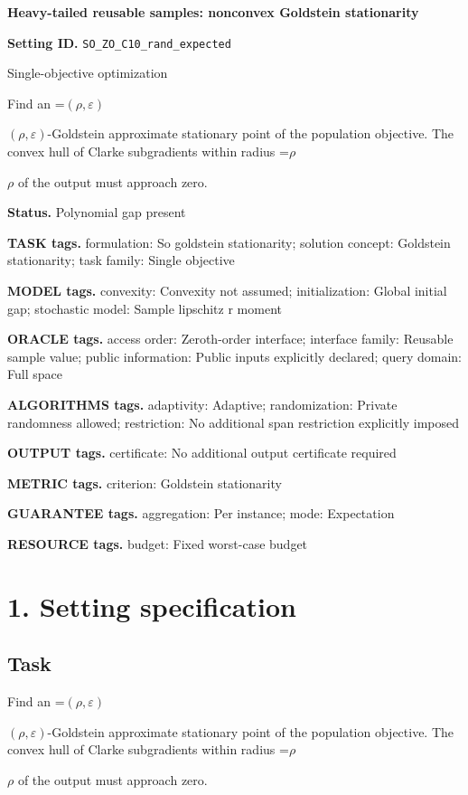 \documentclass[10pt,a4paper]{article}
\newcommand{\AtlasMath}[1]{\par\begingroup\centering\setbox0=\hbox{$\displaystyle #1$}\ifdim\wd0>1.4\linewidth\typeout{ATLAS WIDE FORMULA: \the\wd0}\fi\ifdim\wd0>\linewidth\resizebox{\linewidth}{!}{\box0}\else\box0\fi\par\endgroup}
\newcommand{\AtlasInlineMath}[1]{\begingroup\setbox0=\hbox{$#1$}\ifdim\wd0>.4\linewidth\endgroup\AtlasMath{#1}\else\endgroup$#1$\fi}
\begin{document}
\raggedright

{\LARGE\bfseries\sffamily\color{AtlasNavy} Heavy-tailed reusable samples: nonconvex Goldstein stationarity\par}\vspace{5pt}
\textbf{Setting ID.} \texttt{SO\_\allowbreak{}ZO\_\allowbreak{}C10\_\allowbreak{}rand\_\allowbreak{}expected}

Single-objective optimization

Find an \AtlasInlineMath{(\rho,\varepsilon)}-Goldstein approximate stationary point of the population objective. The convex hull of Clarke subgradients within radius \AtlasInlineMath{\rho} of the output must approach zero.

\textbf{Status.} Polynomial gap present

\textbf{TASK tags.} formulation: So goldstein stationarity; solution concept: Goldstein stationarity; task family: Single objective

\textbf{MODEL tags.} convexity: Convexity not assumed; initialization: Global initial gap; stochastic model: Sample lipschitz r moment

\textbf{ORACLE tags.} access order: Zeroth-order interface; interface family: Reusable sample value; public information: Public inputs explicitly declared; query domain: Full space

\textbf{ALGORITHMS tags.} adaptivity: Adaptive; randomization: Private randomness allowed; restriction: No additional span restriction explicitly imposed

\textbf{OUTPUT tags.} certificate: No additional output certificate required

\textbf{METRIC tags.} criterion: Goldstein stationarity

\textbf{GUARANTEE tags.} aggregation: Per instance; mode: Expectation

\textbf{RESOURCE tags.} budget: Fixed worst-case budget

\section{1. Setting specification}
\subsection{Task}
Find an \AtlasInlineMath{(\rho,\varepsilon)}-Goldstein approximate stationary point of the population objective. The convex hull of Clarke subgradients within radius \AtlasInlineMath{\rho} of the output must approach zero.
\end{document}
